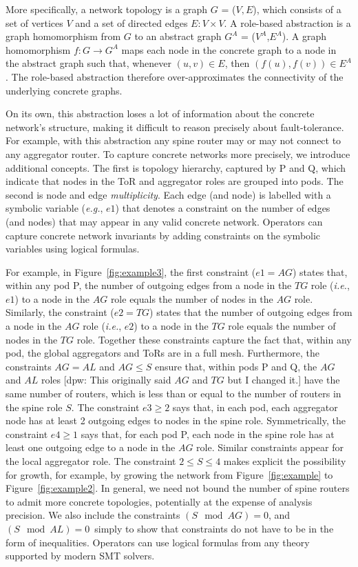 \documentclass[numbers, 10pt]{sigplanconf}
\newcommand{\dpw}[1]{\textcolor{tmlblue}{[dpw: #1]}}
\newcommand{\EG}{\emph{e.g.}}
\newcommand{\IE}{\emph{i.e.}}
\begin{document}
More specifically, a network topology is a graph $G$ = ($V, E$), which consists of a set of vertices $V$ and a set of directed edges $E \colon V \times V$. A role-based abstraction is a graph homomorphism from $G$ to an abstract graph $G^A$ = ($V^A$,$E^A$). A graph homomorphism $f : G \rightarrow G^A$ maps each node in the concrete graph to a node in the abstract graph such that, whenever $(u,v) \in E$, then $(f(u),f(v)) \in E^A$. The role-based abstraction therefore over-approximates the connectivity of the underlying concrete graphs.

On its own, this abstraction loses a lot of information about the concrete network's structure, making it difficult to reason precisely about fault-tolerance.
For example, with this abstraction any spine router may or may not connect to any aggregator router.
%
To capture concrete networks more precisely,
we introduce additional concepts. The first is topology hierarchy, captured by P and Q, which indicate that nodes in the ToR and aggregator roles are grouped into pods.
The second is node and edge \emph{multiplicity}. Each edge (and node) is labelled
with a symbolic variable (\EG, $e1$) that denotes a constraint on the number of edges (and nodes) that may appear in any valid concrete network. Operators can capture concrete network invariants by adding constraints on the symbolic variables using logical formulas.

For example, in Figure~\ref{fig:example3}, the first constraint ($e1 = AG$) 
states that, within any pod P, the number of outgoing edges from a node in the 
$TG$ role (\IE, $e1$) to a node in the $AG$ role equals the number of nodes in the 
$AG$ role. Similarly, the constraint ($e2 = TG$) states that the number of 
outgoing edges from a node in the $AG$ role (\IE, $e2$) to a node in the $TG$ role 
equals the number of nodes in the $TG$ role. Together these constraints capture 
the fact that, within any pod, the global aggregators and ToRs are in 
a full mesh. Furthermore, the constraints $AG = AL$ and $AG \leq S$ ensure 
that, within pods P and Q, the $AG$ and $AL$ roles \dpw{This originally said $AG$ and $TG$ but I changed it.} have the same number of 
routers, which is less than or equal to the number of routers in the spine 
role $S$.
%
The constraint $e3 \geq 2$ says that, in each pod, each aggregator node has at least 2 outgoing edges to nodes in the spine role. Symmetrically, the constraint $e4 \geq 1$ says that, for each pod P, each node in the spine role has at least one outgoing edge to a node in the $AG$ role. Similar constraints appear for the local aggregator role. The constraint $2 \leq S \leq 4$ makes explicit the possibility for growth, for example, by growing the network from Figure~\ref{fig:example} to Figure~\ref{fig:example2}. In general, we need not bound the number of spine routers to admit more concrete topologies, potentially at the expense of analysis precision. We also include the constraints $(S \mod AG) = 0$, and $(S \mod AL) = 0$~simply to show that constraints do not have to be in the form of inequalities. Operators can use logical formulas from any theory supported by modern SMT solvers.
\end{document}
